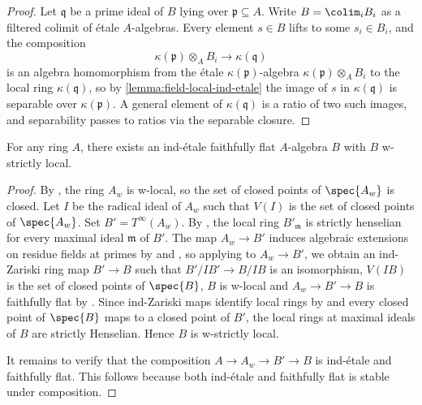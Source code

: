\begin{proof}
    \leanok
    Let $\mathfrak{q}$ be a prime ideal of $B$ lying over $\mathfrak{p} \subseteq A$.
    Write $B = \colim_i B_i$ as a filtered colimit of étale $A$-algebras. Every element
    $s \in B$ lifts to some $s_i \in B_i$, and the composition
    \[
        \kappa(\mathfrak{p}) \otimes_A B_i \to \kappa(\mathfrak{q})
    \]
    is an algebra homomorphism from the étale $\kappa(\mathfrak{p})$-algebra
    $\kappa(\mathfrak{p}) \otimes_A B_i$ to the local ring $\kappa(\mathfrak{q})$, so by
    \ref{lemma:field-local-ind-etale} the image of $s$ in $\kappa(\mathfrak{q})$ is separable
    over $\kappa(\mathfrak{p})$. A general element of $\kappa(\mathfrak{q})$ is a ratio of two
    such images, and separability passes to ratios via the separable closure.
\end{proof}

\begin{proposition}
    For any ring \(A\), there exists an ind-étale faithfully flat \(A\)-algebra \(B\) with \(B\) w-strictly local.
    \label{thm:ind-etale-w-strictly-local-cover}
\end{proposition}

\begin{proof}
    By , the ring $A_w$ is w-local, so the set of closed points
    of $\spec{A_w}$ is closed.
    Let $I$ be the radical ideal of $A_w$ such that $V(I)$ is the set of closed points of $\spec{A_w}$.
    Set $B' = T^{\infty}(A_w)$.
    By , the local ring $B'_{\mathfrak{m}}$ is
    strictly henselian for every maximal ideal $\mathfrak{m}$ of $B'$.
    The map $A_w \to B'$ induces algebraic extensions on residue fields at primes by
     and ,
    so applying  to $A_w \to B'$, we obtain
    an ind-Zariski ring map $B' \to B$ such that $B'/IB' \to B/IB$ is an isomorphism,
    $V(IB)$ is the set of closed points of $\spec{B}$, $B$ is w-local
    and $A_w \to B' \to B$ is faithfully flat by . Since ind-Zariski maps identify
    local rings by  and every closed point of
    $\spec{B}$ maps to a closed point of $B'$,
    the local rings at maximal ideals of $B$ are strictly Henselian. Hence $B$ is w-strictly local.

    It remains to verify that the composition $A \to A_w \to B' \to B$ is ind-étale and faithfully flat.
    This follows because both ind-étale and faithfully flat is stable under composition.
\end{proof}

